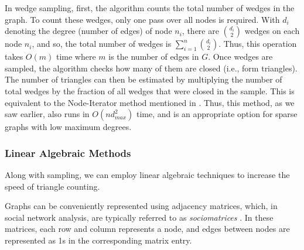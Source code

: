 \documentclass[11pt, margin=1in]{article}
\begin{document}
In wedge sampling, first, the algorithm counts the total number of wedges in the graph.
To count these wedges, only one pass over all nodes is required.
With $d_i$ denoting the degree (number of edges) of node $n_i$, there are $\binom{d_i}{2}$ wedges on each node $n_i$, and so, the total number of wedges is $\sum_{i = 1}^{n}\binom{d_i}{2}$.
Thus, this operation takes $O(m)$ time where $m$ is the number of edges in $G$.
Once wedges are sampled, the algorithm checks how many of them are closed (i.e., form triangles).
The number of triangles can then be estimated by multiplying the number of total wedges by the fraction of all wedges that were closed in the sample.
This is equivalent to the Node-Iterator method mentioned in .
Thus, this method, as we saw earlier, also runs in $O(nd_{max}^2)$ time, and is an appropriate option for sparse graphs with low maximum degrees.

\subsubsection{Linear Algebraic Methods}

Along with sampling, we can employ linear algebraic techniques to increase the speed of triangle counting.

Graphs can be conveniently represented using adjacency matrices, which, in social network analysis, are typically referred to as \emph{sociomatrices} \cite{beum_method_1950}. 
In these matrices, each row and column represents a node, and edges between nodes are represented as 1s in the corresponding matrix entry.
\end{document}
